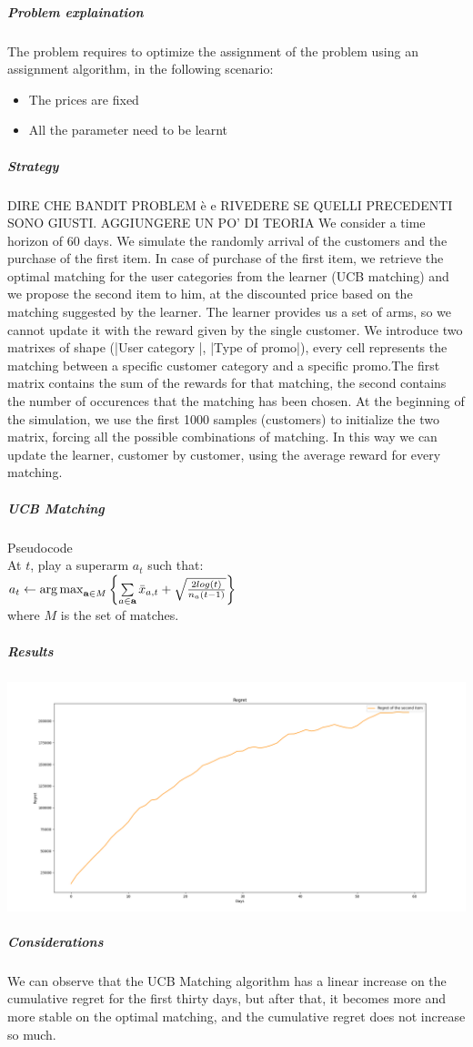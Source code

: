 \subparagraph*{Problem explaination}
The problem requires to optimize the assignment of the problem using an assignment algorithm, in the following scenario:
\begin{itemize}
	\item The prices are fixed
	\item All the parameter need to be learnt
\end{itemize}
\subparagraph*{Strategy}
DIRE CHE BANDIT PROBLEM è e RIVEDERE SE QUELLI PRECEDENTI SONO GIUSTI. AGGIUNGERE UN PO' DI TEORIA
We consider a time horizon of 60 days. We simulate the randomly arrival of the customers and the purchase of the first item. In case of purchase of the first item, we retrieve the optimal matching for the user categories from the learner (UCB matching) and we propose the second item to him, at the discounted price based on the matching suggested by the learner. The learner provides us a set of arms, so we cannot update it with the reward given by the single customer. We introduce two matrixes of shape (|User category |, |Type of promo|), every cell represents the matching between a specific customer category and a specific promo.The first matrix contains the sum of the rewards for that matching, the second contains the number of occurences that the matching has been chosen. At the beginning of the simulation, we use the first 1000 samples (customers) to initialize the two matrix, forcing all the possible combinations of matching. In this way we can update the learner, customer by customer, using the average reward for every matching. 
\subparagraph*{UCB Matching}
Pseudocode\\
At $t$, play a superarm $a_{t}$ such that:\\
$a_{t} \leftarrow \operatorname{arg\,max}\limits_{\textbf{a} \in M}{\left\{\sum\limits_{a \in \textbf{a}}\bar{x}_{a,t} + \sqrt{\frac{2 log(t)}{{n_{a}(t-1)}} }\right\}}$ \\
where $M$ is the set of matches.
\subparagraph*{Results}
\begin{center}
	\includegraphics[scale=0.30]{Images/n5}
\end{center}
\subparagraph*{Considerations}
We can observe that the UCB Matching algorithm has a linear increase on the cumulative regret for the first thirty days, but after that, it becomes more and more stable on the optimal matching, and the cumulative regret does not increase so much.